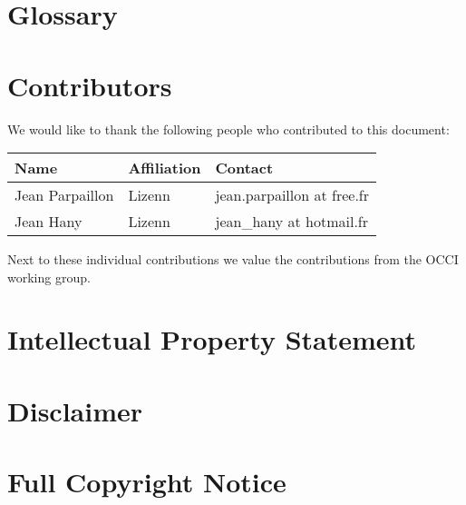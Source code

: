 \documentclass[10pt,a4paper]{article}
\begin{document}
\section{Glossary}
\label{sec:glossary}


\section{Contributors}

We would like to thank the following people who contributed to this
document:

\begin{tabular}{l|p{2in}|p{2in}}
Name & Affiliation & Contact \\
\hline
Jean Parpaillon & Lizenn & jean.parpaillon at free.fr \\
Jean Hany & Lizenn & jean\_hany at hotmail.fr
\end{tabular}

Next to these individual contributions we value the contributions from
the OCCI working group.

\section{Intellectual Property Statement}


\section{Disclaimer}


\section{Full Copyright Notice}




\end{document}
